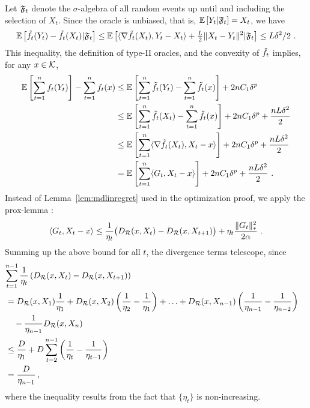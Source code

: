 Let $\mathfrak{F}_t$ denote the $\sigma$-algebra of all random events up until and including the selection of $X_t$. Since the oracle is unbiased, that is,  $\mathbb{E}\left[Y_t|\mathfrak{F}_t\right]=X_t$, we have
\begin{equation}
\mathbb{E}\left[\tilde{f}_t(Y_t)-\tilde{f}_t(X_t)|\mathfrak{F}_t\right] \le \mathbb{E}\left[\langle \nabla \tilde{f}_t(X_t),Y_t-X_t \rangle+\tfrac{L}{2}\|X_t-Y_t\|^2|\mathfrak{F}_t\right] \le L\delta^2/2~.
\label{eq:YX}
\end{equation}
This inequality, the definition of type-II oracles, and the convexity of $\tilde{f}_t$ implies, for any $x \in \mathcal{K}$,
\begin{align}
\mathbb{E}\left[\sum_{t=1}^n f_t(Y_t)\right] - \sum_{t=1}^n f_t(x) 
& \le \mathbb{E}\left[\sum_{t=1}^n \tilde{f}_t(Y_t) -  \sum_{t=1}^n \tilde{f}_t(x)\right] + 2 n C_1 \delta^{p} \nonumber \\
& \le \mathbb{E}\left[\sum_{t=1}^n \tilde{f}_t(X_t) -  \sum_{t=1}^n \tilde{f}_t(x)\right] + 2 n C_1 \delta^{p} + \frac{n L \delta^2}{2} \nonumber \\
& \le \mathbb{E}\left[\sum_{t=1}^n \langle \nabla \tilde{f}_t(X_t), X_t-x  \rangle\right] + 2 n C_1 \delta^{p} + \frac{n L \delta^2}{2} \label{eq:t2-lin} \\
& = \mathbb{E}\left[\sum_{t=1}^n \langle G_t, X_t-x  \rangle\right] + 2 n C_1 \delta^{p} + \frac{n L \delta^2}{2}~.
\label{eq:t2-grad}
\end{align}
Instead of Lemma~\ref{lem:mdlinregret} used in the optimization proof, we apply the prox-lemma \citep[see, e.g.,][]{Beck2003mirror, NeJuLaSh09}:
\begin{equation}
\label{eq:proxlemma}
\langle G_t,X_t-x \rangle \le \frac{1}{\eta_t}\big(D_{\mathcal{R}}(x,X_t)-D_{\mathcal{R}}(x,X_{t+1})\big) + \eta_t \frac{\|G_t\|_*^2}{2\alpha}~.
\end{equation}
Summing up the above bound for all $t$, the divergence terms telescope, since
\begin{align}
\lefteqn{\sum_{t=1}^{n-1} \frac{1}{\eta_t} \left(\DR(x,X_t)-\DR(x,X_{t+1})\right)}
 \nonumber \\
&= \DR(x,X_1) \frac{1}{\eta_1} + \DR(x,X_2) \left(\frac{1}{\eta_2}-\frac{1}{\eta_1}\right)
+ \ldots+\DR(x,X_{n-1}) \left(\frac{1}{\eta_{n-1}} -\frac{1}{\eta_{n-2}}\right)\nonumber\\
& \quad- \frac{1}{\eta_{n-1}} \DR(x,X_n) \nonumber \\
& \le \frac{D}{\eta_1} + D \sum_{t=2}^{n-1} \left(\frac1{\eta_{t}}-\frac1{\eta_{t-1}}\right) \nonumber \\
& = \frac{D}{\eta_{n-1}}\,,  \label{eq:div-telescope}
\end{align}
where the inequality results from the fact that $\{\eta_t\}$ is non-increasing.

